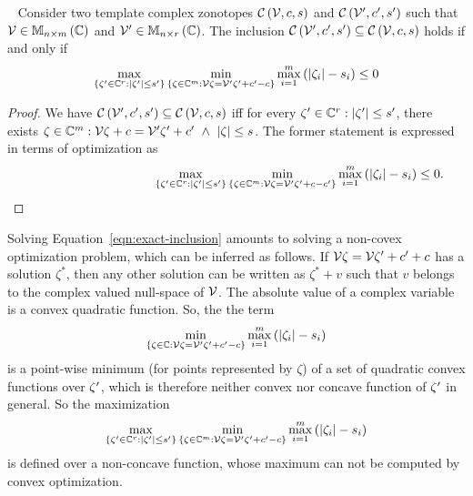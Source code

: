 %
\begin{lemma}~\label{lem:exact-inclusion}
Consider two template complex zonotopes
$\mathit{\mathcal{C}}\left(\mathcal{V},c,s\right)$ and
$\mathit{\mathcal{C}}\left(\mathcal{V}^\prime,c^\prime,s^\prime\right)$ such that
$\mathcal{V}\in\mathbb{M}_{n\times m}\left(\mathbb{C}\right)$ and $\mathcal{V}^\prime\in\mathbb{M}_{n\times r}\left(\mathbb{C}\right)$.  The inclusion
$\mathit{\mathcal{C}}\left(\mathcal{V}^\prime,c^\prime,s^\prime\right)\subseteq\mathit{\mathcal{C}}\left(\mathcal{V},c,s\right)$
holds if and only if
\begin{equation}\label{eqn:exact-inclusion}
\max_{\left\{\zeta^\prime\in\mathbb{C}^{r}:\left|\zeta^\prime\right|\leq s^\prime\right\}}\min_{\left\{\zeta\in\mathbb{C}^m:\mathcal{V}\zeta=\mathcal{V}^\prime\zeta^\prime+c^\prime-c\right\}}\max_{i=1}^m\left(\left|\zeta_i\right|-s_i\right)\leq 0
\end{equation}
\end{lemma}
%
\begin{proof}
We have
$\mathit{\mathcal{C}}\left(\mathcal{V}^\prime,c^\prime,s^\prime\right)\subseteq\mathit{\mathcal{C}}\left(\mathcal{V},c,s\right)$
iff for every $\zeta^\prime\in\mathbb{C}^r:\left|\zeta^\prime\right|\leq s^\prime$,
there exists
$\zeta\in\mathbb{C}^m:\mathcal{V}\zeta+c=\mathcal{V}^\prime\zeta^\prime+c^\prime~\wedge~\left|\zeta\right|\leq
s$.  The former statement is expressed in terms of optimization
as \vspace{-2.2em}\[\hspace{10em}\max_{\set{\zeta^\pr\in\compnums^{r}:\absolute{\zeta^\pr}\leq \sfact^\pr}}\min_{\set{\zeta\in\compnums^m:\ptemp\zeta=\ptemp^\pr\zeta^\pr+\cen-\cen^\pr}}\max_{i=1}^m\lt(\absolute{\zeta_i}-s_i\rt)\leq
0. \]
\end{proof}
%
Solving Equation~\ref{eqn:exact-inclusion} amounts to solving a
non-covex optimization problem, which can be inferred as follows.  If
$\mathcal{V}\zeta=\mathcal{V}\zeta^\prime+c^\prime+c$ has a solution $\zeta^*$,
then any other solution can be written as $\zeta^*+v$ such that $v$
belongs to the complex valued null-space of $\mathcal{V}$.  The absolute
value of a complex variable is a convex quadratic function.  So, the
the
term \[\min_{\left\{\zeta\in\mathbb{C}:\mathcal{V}\zeta=\mathcal{V}^\prime\zeta^\prime+c^\prime-c\right\}}\max_{i=1}^m\left(\left|\zeta_i\right|-s_i\right)\]
is a point-wise minimum (for points represented by $\zeta$) of a set
of quadratic convex functions over $\zeta^\prime$, which is therefore
neither convex nor concave function of $\zeta^\prime$ in general.  So the
maximization
%
\[
\max_{\left\{\zeta^\prime\in\mathbb{C}^{r}:\left|\zeta^\prime\right|\leq s^\prime\right\}}\min_{\left\{\zeta\in\mathbb{C}^m:\mathcal{V}\zeta=\mathcal{V}^\prime\zeta^\prime+c^\prime-c\right\}}\max_{i=1}^m\left(\left|\zeta_i\right|-s_i\right)
\]
%
is defined over a non-concave function, whose maximum can not be
computed by convex optimization.

